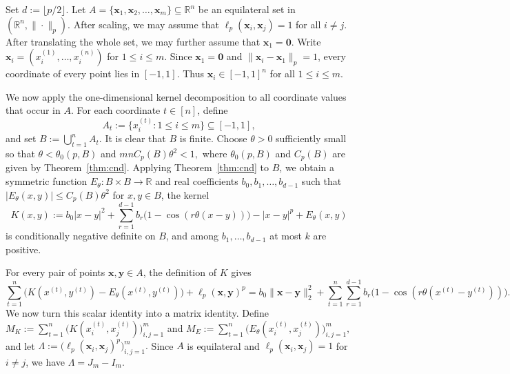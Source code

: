 \documentclass[11pt]{article}
\theoremstyle{definition}
\begin{document}
Set \(d:=\lfloor p/2\rfloor\). Let
\(
A=\{\boldsymbol{x}_1,\boldsymbol{x}_2,\dots,\boldsymbol{x}_m\}\subseteq\mathbb R^n
\)
be an equilateral set in \((\mathbb R^n,\|\cdot\|_p)\). After scaling, we may assume that
\(
\ell_p(\boldsymbol{x}_i,\boldsymbol{x}_j)=1
\)
for all \(i\ne j\). After translating the whole set, we may further assume that
\(
\boldsymbol{x}_1=\boldsymbol{0}.
\)
Write
\(
\boldsymbol{x}_i=(x_i^{(1)},\dots,x_i^{(n)})
\)
for \(1\le i\le m\). Since \(\boldsymbol{x}_1=\boldsymbol{0}\) and \(\|\boldsymbol{x}_i-\boldsymbol{x}_1\|_p=1\), every coordinate of every point lies in \([-1,1]\). Thus
\(
\boldsymbol{x}_i\in[-1,1]^n
\)
for all \(1\le i\le m\).

We now apply the one-dimensional kernel decomposition to all coordinate values that occur in \(A\). For each coordinate \(t\in[n]\), define
\[
A_t:=\{x_i^{(t)}:1\le i\le m\}\subseteq[-1,1],
\]
and set
\(
B:=\bigcup_{t=1}^n A_t.
\)
It is clear that \(B\) is finite. Choose \(\theta>0\) sufficiently small so that
\(
\theta<\theta_0(p,B)
\)
and
\(
mnC_p(B)\theta^2<1,
\)
where \(\theta_0(p,B)\) and \(C_p(B)\) are given by Theorem~\ref{thm:cnd}. Applying Theorem~\ref{thm:cnd} to \(B\), we obtain a symmetric function \(E_\theta:B\times B\to\mathbb R\) and real coefficients
\(
b_0,b_1,\dots,b_{d-1}
\)
such that
\(
|E_\theta(x,y)|\le C_p(B)\theta^2
\)
for \(x,y\in B\), the kernel
\[
K(x,y)
:=
b_0|x-y|^2+\sum_{r=1}^{d-1}b_r\bigl(1-\cos(r\theta(x-y))\bigr)-|x-y|^p+E_\theta(x,y)
\]
is conditionally negative definite on \(B\), and among \(b_1,\dots,b_{d-1}\) at most \(k\) are positive.

For every pair of points \(\boldsymbol{x},\boldsymbol{y}\in A\), the definition of \(K\) gives
\begin{equation}\label{eq:psi-distance-corrected}
\sum_{t=1}^n\bigl(K(x^{(t)},y^{(t)})-E_\theta(x^{(t)},y^{(t)})\bigr)
+\ell_p(\boldsymbol{x},\boldsymbol{y})^p
=
b_0\|\boldsymbol{x}-\boldsymbol{y}\|^2_2
+\sum_{t=1}^n\sum_{r=1}^{d-1}
b_r\bigl(1-\cos(r\theta(x^{(t)}-y^{(t)}))\bigr).
\end{equation}
We now turn this scalar identity into a matrix identity. Define
\(
M_K:=\sum_{t=1}^n\bigl(K(x_i^{(t)},x_j^{(t)})\bigr)_{i,j=1}^m\) and
\(
M_E:=\sum_{t=1}^n\bigl(E_\theta(x_i^{(t)},x_j^{(t)})\bigr)_{i,j=1}^m,
\)
and let
\(
\Lambda:=\bigl(\ell_p(\boldsymbol{x}_i,\boldsymbol{x}_j)^p\bigr)_{i,j=1}^m.
\)
Since \(A\) is equilateral and \(\ell_p(\boldsymbol{x}_i,\boldsymbol{x}_j)=1\) for \(i\ne j\), we have
\(
\Lambda=J_m-I_m.
\)
\end{document}
